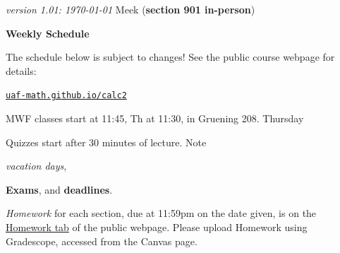 \documentclass[12pt]{article}
\newcommand{\vacinline}[1]{{\color{OliveGreen} \textsl{#1}}}
\newcommand{\vac}[1]{\strut {\small {\vacinline{#1}}}}
\newcommand{\due}[1]{\strut {\color{BrickRed} \textsl{#1}}}
\newcommand{\dl}[1]{{\small \color{Purple} \textbf{#1}}}
\newcommand{\ee}[1]{\strut {\color{Blue} \textbf{#1}}}
\newcommand{\qq}[1]{\strut {\color{RedOrange} #1}}
\begin{document}
\noindent\footnotesize \emph{version 1.01: \today} \normalsize \hfill Meek (\textbf{section 901 in-person})

\medskip
\centerline{\large \textbf{Weekly Schedule}}

\medskip
The schedule below is subject to changes!  See the public course webpage for details:

\medskip

\centerline{\href{https://uaf-math.github.io/calc2/}{\texttt{uaf-math.github.io/calc2}}}

\noindent MWF classes start at 11:45, Th at 11:30, in Gruening 208.
Thursday \qq{Quizzes} start after 30 minutes of lecture.  Note
\vac{vacation days}, \ee{Exams}, and \dl{deadlines}.  \due{Homework}
for each section, due at 11:59pm on the date given, is on the
\href{https://uaf-math.github.io/calc2/}{Homework tab} of the
public webpage.  Please upload Homework using Gradescope, accessed
from the Canvas page.

\medskip
\end{document}
